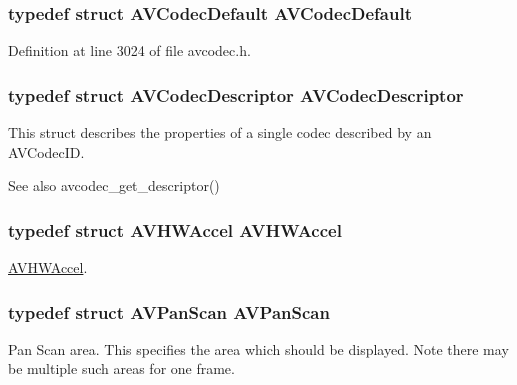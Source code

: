 \subsubsection[{\texorpdfstring{A\+V\+Codec\+Default}{AVCodecDefault}}]{\setlength{\rightskip}{0pt plus 5cm}typedef struct {\bf A\+V\+Codec\+Default} {\bf A\+V\+Codec\+Default}}\hypertarget{group__lavc__core_ga27561af66de4a75c3da1dc61f8c5cd9a}{}\label{group__lavc__core_ga27561af66de4a75c3da1dc61f8c5cd9a}


Definition at line 3024 of file avcodec.\+h.

\subsubsection[{\texorpdfstring{A\+V\+Codec\+Descriptor}{AVCodecDescriptor}}]{\setlength{\rightskip}{0pt plus 5cm}typedef struct {\bf A\+V\+Codec\+Descriptor}  {\bf A\+V\+Codec\+Descriptor}}\hypertarget{group__lavc__core_ga439af7fe133333611f4ae1174e52ee22}{}\label{group__lavc__core_ga439af7fe133333611f4ae1174e52ee22}
This struct describes the properties of a single codec described by an A\+V\+Codec\+ID. \begin{DoxySeeAlso}{See also}
avcodec\+\_\+get\+\_\+descriptor() 
\end{DoxySeeAlso}
\subsubsection[{\texorpdfstring{A\+V\+H\+W\+Accel}{AVHWAccel}}]{\setlength{\rightskip}{0pt plus 5cm}typedef struct {\bf A\+V\+H\+W\+Accel}  {\bf A\+V\+H\+W\+Accel}}\hypertarget{group__lavc__core_ga4e1af181e27d4f0eddef2a4125866884}{}\label{group__lavc__core_ga4e1af181e27d4f0eddef2a4125866884}
\hyperlink{struct_a_v_h_w_accel}{A\+V\+H\+W\+Accel}. 
\subsubsection[{\texorpdfstring{A\+V\+Pan\+Scan}{AVPanScan}}]{\setlength{\rightskip}{0pt plus 5cm}typedef struct {\bf A\+V\+Pan\+Scan} {\bf A\+V\+Pan\+Scan}}\hypertarget{group__lavc__core_ga29f10e0a8372f4172144b4619a534292}{}\label{group__lavc__core_ga29f10e0a8372f4172144b4619a534292}
Pan Scan area. This specifies the area which should be displayed. Note there may be multiple such areas for one frame. 
